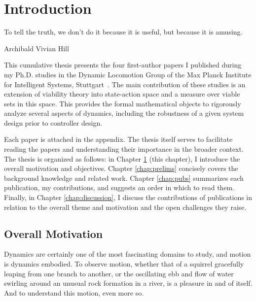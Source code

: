 
\chapter{Introduction} \label{chap:intro}
\epigraph{To tell the truth, we don't do it because it is useful, but because it is amusing.}{Archibald Vivian Hill}

This cumulative thesis presents the four first-author papers I published during my Ph.D. studies in the Dynamic Locomotion Group of the Max Planck Institute for Intelligent Systems, Stuttgart~\cite{heim2018shaping,heim2019beyond,heim2019learnable,heim2018unviable}. The main contribution of these studies is an extension of viability theory into state-action space and a measure over viable sets in this space. This provides the formal mathematical objects to rigorously analyze several aspects of dynamics, including the robustness of a given system design prior to controller design. \par
Each paper is attached in the appendix. The thesis itself serves to facilitate reading the papers and understanding their importance in the broader context. The thesis is organized as follows: in Chapter \ref{chap:intro} (this chapter), I introduce the overall motivation and objectives.
Chapter \ref{chap:prelims} concisely covers the background knowledge and related work.
Chapter \ref{chap:pubs} summarizes each publication, my contributions, and suggests an order in which to read them.
Finally, in Chapter \ref{chap:discussion}, I discuss the contributions of publications in relation to the overall theme and motivation and the open challenges they raise.

\section{Overall Motivation}

Dynamics are certainly one of the most fascinating domains to study, and motion is dynamics embodied. To observe motion, whether that of a squirrel gracefully leaping from one branch to another, or the oscillating ebb and flow of water swirling around an unusual rock formation in a river, is a pleasure in and of itself. And to understand this motion, even more so. \par

